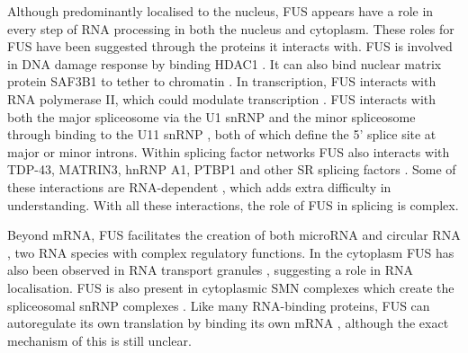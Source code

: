 Although predominantly localised to the nucleus, FUS appears have a role in every step of RNA processing in both the nucleus and cytoplasm. 
These roles for FUS have been suggested through the proteins it interacts with.
FUS is involved in DNA damage response by binding HDAC1 \citep{Wang2013}.
It can also bind nuclear matrix protein SAF3B1 to tether to chromatin \citep{Yamaguchi2016}. %
In transcription, FUS interacts with RNA polymerase II, which could modulate transcription \citep{Schwartz2012}. %
FUS interacts with both the major spliceosome via the U1 snRNP \citep{Sun2015a, Yu2015a} and the minor spliceosome through binding to  the U11 snRNP \citep{Reber2016}, both of which define the 5' splice site at major or minor introns.
Within splicing factor networks FUS also interacts with TDP-43, MATRIN3, hnRNP A1, PTBP1 and other SR splicing factors \citep{Lagier-Tourenne2012,Yamaguchi2016,Yang1998,Meissner2003, Kamelgarn2016}. 
Some of these interactions are RNA-dependent \citep{Kamelgarn2016}, which adds extra difficulty in understanding.
With all these interactions, the role of FUS in splicing is complex.

Beyond mRNA, FUS facilitates the creation of both microRNA \citep{Morlando2012} and circular RNA \citep{Errichelli2017}, two RNA species with complex regulatory functions.
In the cytoplasm FUS has also been observed in RNA transport granules \citep{Kanai2004, Fujii2005}, suggesting a role in RNA localisation. %
FUS is also present in cytoplasmic SMN complexes which create the spliceosomal snRNP complexes  \citep{Yamazaki2012,Groen2013}.
Like many RNA-binding proteins, FUS can autoregulate its own translation by binding its own mRNA \citep{Zhou2013}, although the exact mechanism of this is still unclear.



